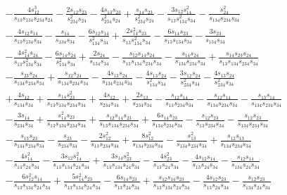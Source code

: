 \begin{align}
        & - \frac{4s_{12}^3}{s_{13}s_{134}s_{234}s_{24}} - \frac{2s_{12}s_{23}}{s_{234}^2s_{24}} - \frac{4s_{13}s_{23}}{s_{234}^2s_{24}} + \frac{s_{14}s_{23}}{s_{234}^2s_{24}} - \frac{3s_{12}s_{14}^2}{s_{13}s_{134}^2s_{34}} - \frac{s_{24}^2}{s_{134}s_{234}s_{34}} \nonumber \\
        & - \frac{4s_{12}s_{14}}{s_{13}s_{134}s_{34}} - \frac{s_{14}}{s_{134}s_{34}} - \frac{6s_{12}s_{14}}{s_{134}^2s_{34}} + \frac{2s_{14}^2s_{23}}{s_{13}s_{134}^2s_{34}} - \frac{6s_{14}s_{23}}{s_{13}s_{134}s_{34}} - \frac{3s_{23}}{s_{134}s_{34}} \nonumber \\
        & - \frac{4s_{14}^2s_{24}}{s_{13}s_{134}^2s_{34}} - \frac{6s_{14}s_{24}}{s_{134}^2s_{34}} + \frac{2s_{24}}{s_{134}s_{34}} - \frac{s_{12}s_{14}s_{24}}{s_{13}s_{134}s_{234}s_{34}} - \frac{s_{14}s_{24}}{s_{134}s_{234}s_{34}} + \frac{s_{14}s_{23}s_{24}}{s_{13}s_{134}s_{234}s_{34}} \nonumber \\
        & - \frac{s_{23}s_{24}}{s_{134}s_{234}s_{34}} + \frac{s_{12}s_{24}}{s_{134}s_{234}s_{34}} - \frac{4s_{13}s_{24}}{s_{134}s_{234}s_{34}} - \frac{4s_{13}s_{24}}{s_{134}^2s_{34}} - \frac{3s_{12}s_{24}}{s_{234}^2s_{34}} - \frac{4s_{13}s_{24}}{s_{234}^2s_{34}} \nonumber \\
        & + \frac{4s_{12}}{s_{134}s_{34}} + \frac{s_{14}s_{23}^2}{s_{13}s_{134}s_{234}s_{34}} + \frac{4s_{12}}{s_{234}s_{34}} + \frac{2s_{13}}{s_{234}s_{34}} - \frac{s_{12}s_{14}}{s_{13}s_{234}s_{34}} - \frac{s_{12}s_{14}}{s_{134}s_{234}s_{34}} - \frac{s_{13}s_{14}}{s_{134}s_{234}s_{34}} \nonumber \\
        & - \frac{3s_{14}}{s_{234}s_{34}} + \frac{s_{14}^2s_{23}}{s_{13}s_{134}s_{234}s_{34}} + \frac{s_{12}s_{14}s_{23}}{s_{13}s_{134}s_{234}s_{34}} + \frac{6s_{14}s_{23}}{s_{134}s_{234}s_{34}} - \frac{s_{12}s_{23}}{s_{13}s_{234}s_{34}} - \frac{s_{12}s_{23}}{s_{134}s_{234}s_{34}} \nonumber \\
        & - \frac{s_{13}s_{23}}{s_{134}s_{234}s_{34}} - \frac{s_{23}}{s_{234}s_{34}} - \frac{2s_{12}^2}{s_{13}s_{234}s_{34}} + \frac{8s_{12}^2}{s_{134}s_{234}s_{34}} - \frac{s_{13}^2}{s_{134}s_{234}s_{34}} + \frac{s_{12}s_{13}}{s_{134}s_{234}s_{34}} \nonumber \\
        & - \frac{4s_{14}^2}{s_{13}s_{24}s_{34}} - \frac{3s_{12}s_{14}^2}{s_{13}s_{134}s_{24}s_{34}} + \frac{3s_{14}s_{23}^2}{s_{13}s_{134}s_{24}s_{34}} - \frac{4s_{23}^2}{s_{13}s_{24}s_{34}} - \frac{4s_{12}s_{14}}{s_{13}s_{24}s_{34}} - \frac{s_{12}s_{14}}{s_{134}s_{24}s_{34}} \nonumber \\
        & - \frac{6s_{12}^2s_{14}}{s_{13}s_{134}s_{24}s_{34}} + \frac{5s_{14}^2s_{23}}{s_{13}s_{134}s_{24}s_{34}} - \frac{6s_{14}s_{23}}{s_{13}s_{24}s_{34}} + \frac{s_{12}s_{14}s_{23}}{s_{13}s_{134}s_{24}s_{34}} - \frac{4s_{12}s_{23}}{s_{13}s_{24}s_{34}} - \frac{s_{12}s_{23}}{s_{134}s_{24}s_{34}} \nonumber \\

\end{align}
